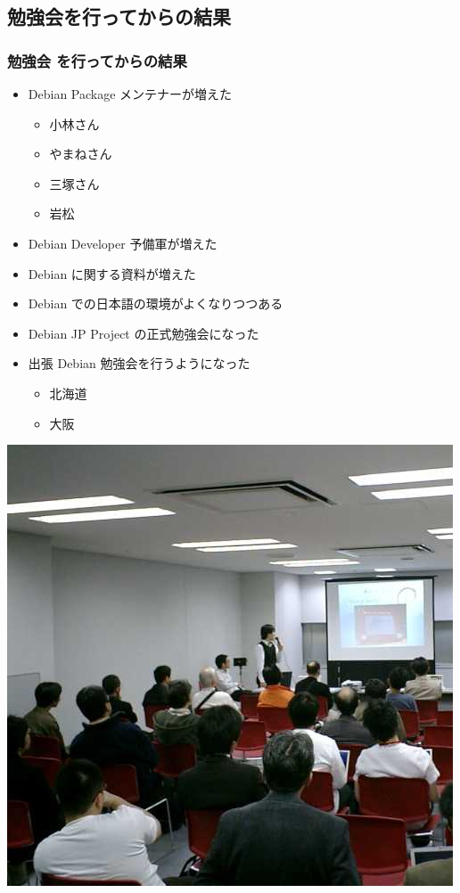 \documentclass[cjk,dvipdfmx]{beamer}
\begin{document}
\subsection{勉強会を行ってからの結果}
\begin{frame}
 \frametitle{勉強会 を行ってからの結果}
\begin{itemize}
  \item<1-> Debian Package メンテナーが増えた
    \begin{itemize}
	\item 小林さん
	\item やまねさん
	\item 三塚さん
	\item 岩松
    \end{itemize}	
  \item<2-> Debian Developer 予備軍が増えた
  \item<3-> Debian に関する資料が増えた
  \item<4-> Debian での日本語の環境がよくなりつつある
  \item<5-> Debian JP Project の正式勉強会になった
  \item<6-> 出張 Debian 勉強会を行うようになった
    \begin{itemize}
	\item 北海道
	\item 大阪
    \end{itemize}	
\end{itemize}
\end{frame}

\begin{frame}
 \includegraphics[width=0.8\hsize]{image200611/meeting.jpg}
\end{frame}
\end{document}
